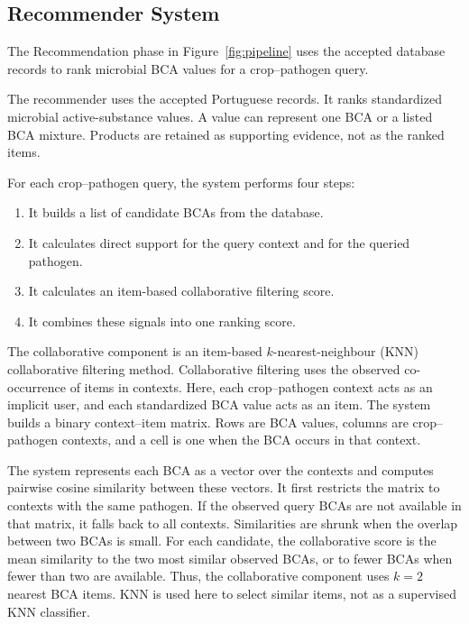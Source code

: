 \subsection{Recommender System}\label{subsec:recommendation-methodology}

The Recommendation phase in Figure~\ref{fig:pipeline} uses the accepted database records to rank microbial BCA values for a crop--pathogen query.

The recommender uses the accepted Portuguese records. It ranks standardized microbial active-substance values. A value can
represent one BCA or a listed BCA mixture. Products are retained as supporting evidence, not as the ranked items.

For each crop--pathogen query, the system performs four steps:

\begin{enumerate}
    \item It builds a list of candidate BCAs from the database.
    \item It calculates direct support for the query context and for the queried pathogen.
    \item It calculates an item-based collaborative filtering score.
    \item It combines these signals into one ranking score.
\end{enumerate}

The collaborative component is an item-based $k$-nearest-neighbour (KNN) collaborative filtering method. Collaborative
filtering uses the observed co-occurrence of items in contexts. Here, each crop--pathogen context acts as an implicit
user, and each standardized BCA value acts as an item. The system builds a binary context--item matrix. Rows are BCA
values, columns are crop--pathogen contexts, and a cell is one when the BCA occurs in that context.

The system represents each BCA as a vector over the contexts and computes pairwise cosine similarity between these
vectors. It first restricts the matrix to contexts with the same pathogen. If the observed query BCAs are not available
in that matrix, it falls back to all contexts. Similarities are shrunk when the overlap between two BCAs is small. For
each candidate, the collaborative score is the mean similarity to the two most similar observed BCAs, or to fewer BCAs
when fewer than two are available. Thus, the collaborative component uses $k=2$ nearest BCA items. KNN is used here
to select similar items, not as a supervised KNN classifier.

